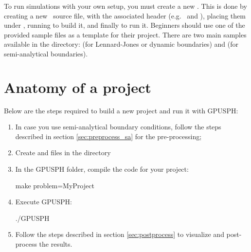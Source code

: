 To run simulations with your own setup, you must create a new
. This is done by creating a new \cpp\ source file, with
the associated header (e.g.\  and ),
placing them under , running  to
build it, and finally  to run it. Beginners should use one
of the provided sample files as a template for their project.
There are two main samples available in the  directory: 
 (for Lennard-Jones or dynamic boundaries) 
and  (for semi-analytical boundaries).\\

%
%

\section{Anatomy of a project}

Below are the steps required to build a new project and run it with GPUSPH:
\begin{enumerate}
\item In case you use semi-analytical boundary conditions, follow the steps 
described in section \ref{sec:preprocess_sa} for the pre-processing;
\item Create  and  files in 
the  directory
\item In the GPUSPH folder, compile the code for your project:
\begin{shellcode}
make problem=MyProject
\end{shellcode}
\item Execute GPUSPH:
\begin{shellcode}
./GPUSPH
\end{shellcode}
\item Follow the steps described in section \ref{sec:postprocess} 
to visualize and post-process the results.
\end{enumerate}

